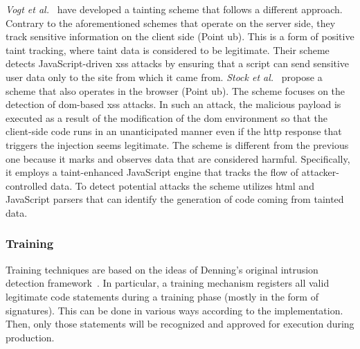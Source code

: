 \documentclass[conference]{IEEEtran}
\begin{document}
{\it Vogt et al.}~\cite{VFJKKV07} have developed a tainting scheme
that follows a different approach. Contrary to the aforementioned
schemes that operate on the server side, they track sensitive
information on the client side (Point {\sc ub}). This is a form of
positive taint tracking, where taint data is considered to be
legitimate. Their scheme detects JavaScript-driven {\sc xss} attacks
by ensuring that a script can send sensitive user data only to the
site from which it came from.
{\it Stock et al.}~\cite{SLMS14} propose a scheme that also operates
in the browser (Point {\sc ub}). The scheme focuses on the detection of
{\sc dom}-based {\sc xss} attacks. In such an attack, the malicious
payload is executed as a result of the modification of the {\sc dom}
environment so that the client-side code runs in an unanticipated
manner even if the {\sc http} response that triggers the injection
seems legitimate. The scheme is different from the previous one
because it marks and observes data that are considered harmful.
Specifically, it employs a taint-enhanced JavaScript engine that
tracks the flow of attacker-controlled data. To detect potential
attacks the scheme utilizes {\sc html} and JavaScript parsers that can
identify the generation of code coming from tainted data.

\subsubsection{Training}
\label{sec:train}

Training techniques are based on the ideas of Denning's original
intrusion detection framework~\cite{Den87}. In particular, a training
mechanism registers all valid legitimate code statements during a
training phase (mostly in the form of signatures). This can be done in
various ways according to the implementation. Then, only those
statements will be recognized and approved for execution during
production.
\end{document}
